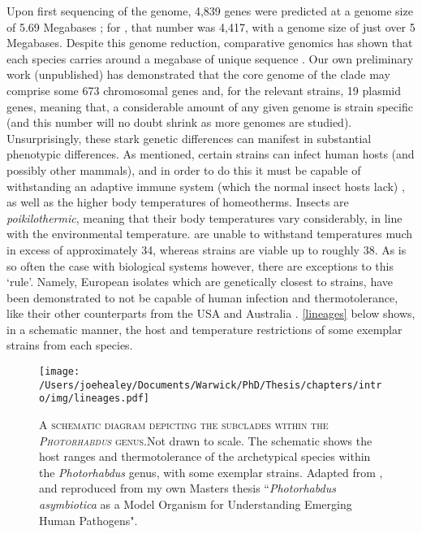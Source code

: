 Upon first sequencing of the \Plum{} genome, 4,839 genes were predicted at a genome size of 5.69 Megabases \citep{Duchaud2003}; for \Pasy, that number was 4,417, with a genome size of just over 5 Megabases. Despite this genome reduction, comparative genomics has shown that each species carries around a megabase of unique sequence \citep{Wilkinson2009a}. Our own preliminary work (unpublished) has demonstrated that the core genome of the clade may comprise some 673 chromosomal genes and, for the relevant strains, 19 plasmid genes, meaning that, a considerable amount of any given \Pa{} genome is strain specific (and this number will no doubt shrink as more genomes are studied). Unsurprisingly, these stark genetic differences can manifest in substantial phenotypic differences. As mentioned, certain \Pasy{} strains can infect human hosts (and possibly other mammals), and in order to do this it must be capable of withstanding an adaptive immune system (which the normal insect hosts lack) \citep{Lemaitre2007a}, as well as the higher body temperatures of homeotherms. Insects are \emph{poikilothermic}, meaning that their body temperatures vary considerably, in line with the environmental temperature. \Plum{} are unable to withstand temperatures much in excess of approximately 34\degC, whereas \Pasy{} strains are viable up to roughly 38\degC. As is so often the case with biological systems however, there are exceptions to this `rule'. Namely, European isolates which are genetically closest to \Pasy{} strains, have been demonstrated to not be capable of human infection and thermotolerance, like their other \Pasy{} counterparts from the USA and Australia \citep{Peat2010, Mulley2015}. \vref{lineages} below shows, in a schematic manner, the host and temperature restrictions of some exemplar strains from each species.

\begin{figure}[h]
    \texttt{[image: /Users/joehealey/Documents/Warwick/PhD/Thesis/chapters/intro/img/lineages.pdf]}
    \captionsetup{singlelinecheck=off, justification=justified, font=footnotesize, aboveskip=0pt}
    \caption[Schematic diagram of \emph{Photorhabdus} lineages]{\textsc{\normalsize A schematic diagram depicting the subclades within the \emph{Photorhabdus} genus.}\vspace{0.1cm}\newline Not drawn to scale. The schematic shows the host ranges and thermotolerance of the archetypical species within the \emph{Photorhabdus} genus, with some exemplar strains. Adapted from \citep{Waterfield2009}, and reproduced from my own Masters thesis ``\emph{Photorhabdus asymbiotica} as a Model Organism for Understanding Emerging Human Pathogens".}\label{lineages}
\end{figure}

